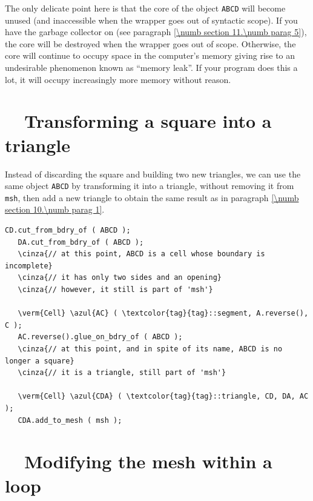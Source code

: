 The only delicate point here is that the core of the {\small\tt{}} object
{\small\tt ABCD}
will become unused (and inaccessible when the wrapper goes out of syntactic scope).
If you have the garbage collector on (see paragraph \ref{\numb section 11.\numb parag 5}),
the core will be destroyed when the wrapper goes out of scope.
Otherwise, the core will continue to occupy space in the computer's memory giving rise
to an undesirable phenomenon known as ``memory leak''.
If your program does this a lot, it will occupy increasingly more memory without reason.


\section{~~{Transforming a square into a triangle}}\label{\numb section 10.\numb parag 2}

Instead of discarding the square and building two new triangles, we can use the same
{\small\tt{}} object {\small\tt ABCD}
by transforming it into a triangle, without removing it from {\small\tt msh}, then add
a new triangle to obtain the same result as in paragraph \ref{\numb section 10.\numb parag 1}.

\begin{Verbatim}[commandchars=\\\{\},formatcom=\small\tt,frame=single,
   label=parag-\ref{\numb section 10.\numb parag 2}.cpp,rulecolor=\color{coment},
   baselinestretch=0.94,framesep=2mm]
   CD.cut_from_bdry_of ( ABCD );
   DA.cut_from_bdry_of ( ABCD );
   \cinza{// at this point, ABCD is a cell whose boundary is incomplete}
   \cinza{// it has only two sides and an opening}
   \cinza{// however, it still is part of 'msh'}

   \verm{Cell} \azul{AC} ( \textcolor{tag}{tag}::segment, A.reverse(), C );
   AC.reverse().glue_on_bdry_of ( ABCD );
   \cinza{// at this point, and in spite of its name, ABCD is no longer a square}
   \cinza{// it is a triangle, still part of 'msh'}

   \verm{Cell} \azul{CDA} ( \textcolor{tag}{tag}::triangle, CD, DA, AC );
   CDA.add_to_mesh ( msh );
\end{Verbatim}



\section{~~Modifying the mesh within a loop}\label{\numb section 10.\numb parag 3}

